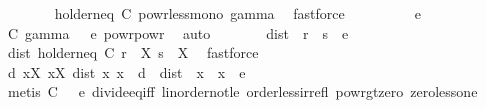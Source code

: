 \begin{isabellebody}
\ \ \ \ \ \ \isamarkupfalse%
\ holder{\isacharunderscore}{\kern0pt}neq{\isacharunderscore}{\kern0pt}{}\ C{\isacharparenleft}{\kern0pt}{}{\isacharparenright}{\kern0pt}\ powr{\isacharunderscore}{\kern0pt}less{\isacharunderscore}{\kern0pt}mono{}\ gamma\ \isamarkupfalse%
\ fastforce\isanewline
\ \ \ \ \isamarkupfalse%
\ \isamarkupfalse%
\ {\isachardoublequoteopen}{\isachardot}{\kern0pt}{\isachardot}{\kern0pt}{\isachardot}{\kern0pt}\ {\isacharequal}{\kern0pt}\ e{\isachardoublequoteclose}\isanewline
\ \ \ \ \ \ \isamarkupfalse%
\ C{\isacharparenleft}{\kern0pt}{}{\isacharparenright}{\kern0pt}\ gamma\ {\isacartoucheopen}{}\ {\isacharless}{\kern0pt}\ e{\isacartoucheclose}\ powr{\isacharunderscore}{\kern0pt}powr\ \isamarkupfalse%
\ auto\isanewline
\ \ \ \ \isamarkupfalse%
\ \isamarkupfalse%
\ {\isachardoublequoteopen}dist\ {\isacharparenleft}{\kern0pt}{\isasymphi}\ r{\isacharparenright}{\kern0pt}\ {\isacharparenleft}{\kern0pt}{\isasymphi}\ s{\isacharparenright}{\kern0pt}\ {\isacharless}{\kern0pt}\ e{\isachardoublequoteclose}\isanewline
\ \ \ \ \ \ \isamarkupfalse%
\ dist{\isacharunderscore}{\kern0pt}{}\ holder{\isacharunderscore}{\kern0pt}neq{\isacharunderscore}{\kern0pt}{}\ C{\isacharparenleft}{\kern0pt}{}{\isacharparenright}{\kern0pt}\ {\isacartoucheopen}r\ {\isasymin}\ X{\isacartoucheclose}\ {\isacartoucheopen}s\ {\isasymin}\ X{\isacartoucheclose}\ \isamarkupfalse%
\ fastforce\isanewline
\ \ \isacommand{{\isacharbraceright}{\kern0pt}}\isamarkupfalse%
\isanewline
\ \ \isamarkupfalse%
\ \isamarkupfalse%
\ {\isachardoublequoteopen}{\isasymexists}d{\isachargreater}{\kern0pt}{}{\isachardot}{\kern0pt}\ {\isasymforall}x{\isasymin}X{\isachardot}{\kern0pt}\ {\isasymforall}x{\isacharprime}{\kern0pt}{\isasymin}X{\isachardot}{\kern0pt}\ dist\ x{\isacharprime}{\kern0pt}\ x\ {\isacharless}{\kern0pt}\ d\ {\isasymlongrightarrow}\ dist\ {\isacharparenleft}{\kern0pt}{\isasymphi}\ x{\isacharprime}{\kern0pt}{\isacharparenright}{\kern0pt}\ {\isacharparenleft}{\kern0pt}{\isasymphi}\ x{\isacharparenright}{\kern0pt}\ {\isacharless}{\kern0pt}\ e{\isachardoublequoteclose}\isanewline
\ \ \ \ \isamarkupfalse%
\ {\isacharparenleft}{\kern0pt}metis\ C{\isacharparenleft}{\kern0pt}{}{\isacharparenright}{\kern0pt}\ {\isacartoucheopen}{}\ {\isacharless}{\kern0pt}\ e{\isacartoucheclose}\ divide{\isacharunderscore}{\kern0pt}eq{\isacharunderscore}{\kern0pt}{}{\isacharunderscore}{\kern0pt}iff\ linorder{\isacharunderscore}{\kern0pt}not{\isacharunderscore}{\kern0pt}le\ order{\isacharunderscore}{\kern0pt}less{\isacharunderscore}{\kern0pt}irrefl\ powr{\isacharunderscore}{\kern0pt}gt{\isacharunderscore}{\kern0pt}zero\ zero{\isacharunderscore}{\kern0pt}less{\isacharunderscore}{\kern0pt}one{\isacharparenright}{\kern0pt}\isanewline

\end{isabellebody}

